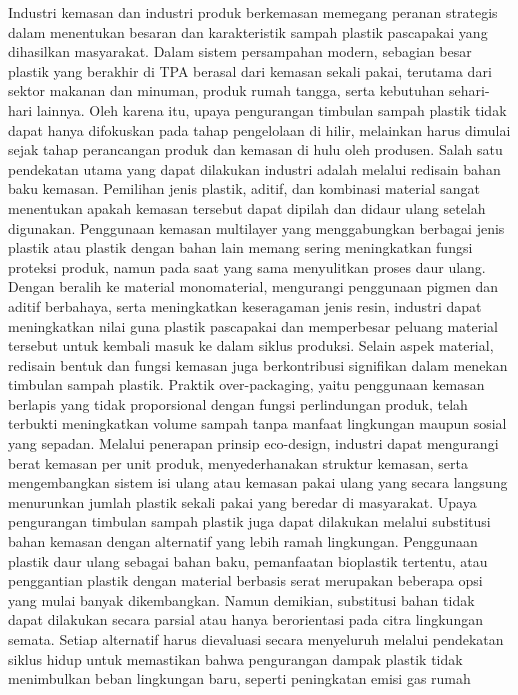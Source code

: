 \documentclass[
  letterpaper,
  DIV=11,
  numbers=noendperiod]{scrreprt}
\begin{document}
Industri kemasan dan industri produk berkemasan memegang peranan
strategis dalam menentukan besaran dan karakteristik sampah plastik
pascapakai yang dihasilkan masyarakat. Dalam sistem persampahan modern,
sebagian besar plastik yang berakhir di TPA berasal dari kemasan sekali
pakai, terutama dari sektor makanan dan minuman, produk rumah tangga,
serta kebutuhan sehari-hari lainnya. Oleh karena itu, upaya pengurangan
timbulan sampah plastik tidak dapat hanya difokuskan pada tahap
pengelolaan di hilir, melainkan harus dimulai sejak tahap perancangan
produk dan kemasan di hulu oleh produsen. Salah satu pendekatan utama
yang dapat dilakukan industri adalah melalui redisain bahan baku
kemasan. Pemilihan jenis plastik, aditif, dan kombinasi material sangat
menentukan apakah kemasan tersebut dapat dipilah dan didaur ulang
setelah digunakan. Penggunaan kemasan multilayer yang menggabungkan
berbagai jenis plastik atau plastik dengan bahan lain memang sering
meningkatkan fungsi proteksi produk, namun pada saat yang sama
menyulitkan proses daur ulang. Dengan beralih ke material monomaterial,
mengurangi penggunaan pigmen dan aditif berbahaya, serta meningkatkan
keseragaman jenis resin, industri dapat meningkatkan nilai guna plastik
pascapakai dan memperbesar peluang material tersebut untuk kembali masuk
ke dalam siklus produksi. Selain aspek material, redisain bentuk dan
fungsi kemasan juga berkontribusi signifikan dalam menekan timbulan
sampah plastik. Praktik over-packaging, yaitu penggunaan kemasan
berlapis yang tidak proporsional dengan fungsi perlindungan produk,
telah terbukti meningkatkan volume sampah tanpa manfaat lingkungan
maupun sosial yang sepadan. Melalui penerapan prinsip eco-design,
industri dapat mengurangi berat kemasan per unit produk, menyederhanakan
struktur kemasan, serta mengembangkan sistem isi ulang atau kemasan
pakai ulang yang secara langsung menurunkan jumlah plastik sekali pakai
yang beredar di masyarakat. Upaya pengurangan timbulan sampah plastik
juga dapat dilakukan melalui substitusi bahan kemasan dengan alternatif
yang lebih ramah lingkungan. Penggunaan plastik daur ulang sebagai bahan
baku, pemanfaatan bioplastik tertentu, atau penggantian plastik dengan
material berbasis serat merupakan beberapa opsi yang mulai banyak
dikembangkan. Namun demikian, substitusi bahan tidak dapat dilakukan
secara parsial atau hanya berorientasi pada citra lingkungan semata.
Setiap alternatif harus dievaluasi secara menyeluruh melalui pendekatan
siklus hidup untuk memastikan bahwa pengurangan dampak plastik tidak
menimbulkan beban lingkungan baru, seperti peningkatan emisi gas rumah
\end{document}
